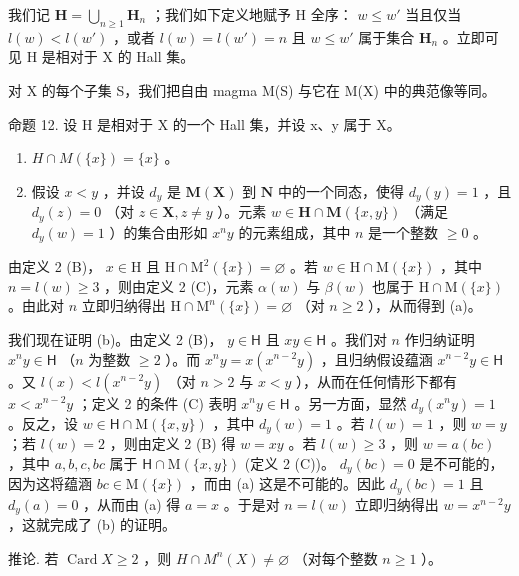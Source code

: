 我们记 \(\mathbf{H} = \bigcup_{n\geqslant 1}\mathbf{H}_n\) ；我们如下定义地赋予 H 全序： \(w\leqslant w'\) 当且仅当 \(l(w) < l(w')\) ，或者 \(l(w) = l(w') = n\) 且 \(w\leqslant w'\) 属于集合 \(\mathbf{H}_n\) 。立即可见 H 是相对于 X 的 Hall 集。

对 X 的每个子集 S，我们把自由 magma M(S) 与它在 M(X) 中的典范像等同。

命题 12. 设 H 是相对于 X 的一个 Hall 集，并设 x、y 属于 X。

\begin{enumerate}
\def\labelenumi{(\alph{enumi})}
\item
  \(H \cap M(\{x\}) = \{x\}\) 。
\item
  假设 \(x < y\) ，并设 \(d_y\) 是 \(\mathbf{M}(\mathbf{X})\) 到 \(\mathbf{N}\) 中的一个同态，使得 \(d_y(y) = 1\) ，且 \(d_y(z) = 0\) （对 \(z \in \mathbf{X}, z \neq y\) ）。元素 \(w \in \mathbf{H} \cap \mathbf{M}(\{x, y\})\) （满足 \(d_y(w) = 1\) ）的集合由形如 \(x^n y\) 的元素组成，其中 \(n\) 是一个整数 \(\geqslant 0\) 。
\end{enumerate}

由定义 2 (B)， \(x \in \mathrm{H}\) 且 \(\mathrm{H} \cap \mathrm{M}^2(\{x\}) = \varnothing\) 。若 \(w \in \mathrm{H} \cap \mathrm{M}(\{x\})\) ，其中 \(n = l(w) \geqslant 3\) ，则由定义 2 (C)，元素 \(\alpha(w)\) 与 \(\beta(w)\) 也属于 \(\mathrm{H} \cap \mathrm{M}(\{x\})\) 。由此对 \(n\) 立即归纳得出 \(\mathrm{H} \cap \mathrm{M}^n(\{x\}) = \varnothing\) （对 \(n \geqslant 2\) ），从而得到 (a)。

我们现在证明 (b)。由定义 2 (B)， \(y \in \mathsf{H}\) 且 \(xy \in \mathsf{H}\) 。我们对 \(n\) 作归纳证明 \(x^n y \in \mathsf{H}\) （\(n\) 为整数 \(\geqslant 2\) ）。而 \(x^n y = x(x^{n-2}y)\) ，且归纳假设蕴涵 \(x^{n-2}y \in \mathsf{H}\) 。又 \(l(x) < l(x^{n-2}y)\) （对 \(n > 2\) 与 \(x < y\) ），从而在任何情形下都有 \(x < x^{n-2}y\) ；定义 2 的条件 (C) 表明 \(x^n y \in \mathsf{H}\) 。另一方面，显然 \(d_y(x^n y) = 1\) 。反之，设 \(w \in \mathsf{H} \cap \mathrm{M}(\{x, y\})\) ，其中 \(d_y(w) = 1\) 。若 \(l(w) = 1\) ，则 \(w = y\) ；若 \(l(w) = 2\) ，则由定义 2 (B) 得 \(w = xy\) 。若 \(l(w) \geqslant 3\) ，则 \(w = a(bc)\) ，其中 \(a, b, c, bc\) 属于 \(\mathsf{H} \cap \mathrm{M}(\{x, y\})\) (定义 2 (C))。 \(d_y(bc) = 0\) 是不可能的，因为这将蕴涵 \(bc \in \mathrm{M}(\{x\})\) ，而由 (a) 这是不可能的。因此 \(d_y(bc) = 1\) 且 \(d_y(a) = 0\) ，从而由 (a) 得 \(a = x\) 。于是对 \(n = l(w)\) 立即归纳得出 \(w = x^{n-2}y\) ，这就完成了 (b) 的证明。

推论. 若 \(\operatorname{Card} X \geqslant 2\) ，则 \(H \cap M^n(X) \neq \varnothing\) （对每个整数 \(n \geqslant 1\) ）。

